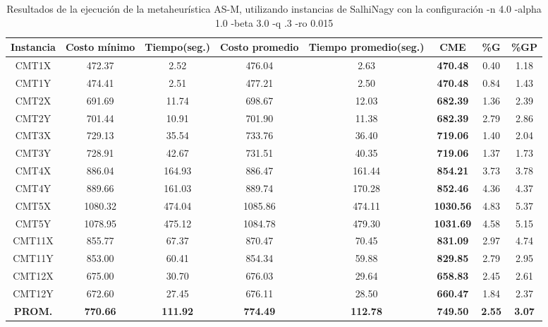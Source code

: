 \begin{table}[h]
\caption{Resultados de la ejecución de la metaheurística AS-M, utilizando instancias de SalhiNagy con la configuración -n 4.0 -alpha 1.0 -beta 3.0 -q .3 -ro 0.015}
\centering
\small
\begin{tabular}{c c c c c c c c}
\hline\hline
Instancia & Costo mínimo & Tiempo(seg.) & Costo promedio & Tiempo promedio(seg.) & CME & \%G & \%GP \\ [0.5ex]
\hline
CMT1X & 472.37 & 2.52 & 
476.04 & 2.63 & \bf{470.48} & 
0.40 & 1.18\\CMT1Y & 474.41 & 2.51 & 
477.21 & 2.50 & \bf{470.48} & 
0.84 & 1.43\\CMT2X & 691.69 & 11.74 & 
698.67 & 12.03 & \bf{682.39} & 
1.36 & 2.39\\CMT2Y & 701.44 & 10.91 & 
701.90 & 11.38 & \bf{682.39} & 
2.79 & 2.86\\CMT3X & 729.13 & 35.54 & 
733.76 & 36.40 & \bf{719.06} & 
1.40 & 2.04\\CMT3Y & 728.91 & 42.67 & 
731.51 & 40.35 & \bf{719.06} & 
1.37 & 1.73\\CMT4X & 886.04 & 164.93 & 
886.47 & 161.44 & \bf{854.21} & 
3.73 & 3.78\\CMT4Y & 889.66 & 161.03 & 
889.74 & 170.28 & \bf{852.46} & 
4.36 & 4.37\\CMT5X & 1080.32 & 474.04 & 
1085.86 & 474.11 & \bf{1030.56} & 
4.83 & 5.37\\CMT5Y & 1078.95 & 475.12 & 
1084.78 & 479.30 & \bf{1031.69} & 
4.58 & 5.15\\CMT11X & 855.77 & 67.37 & 
870.47 & 70.45 & \bf{831.09} & 
2.97 & 4.74\\CMT11Y & 853.00 & 60.41 & 
854.34 & 59.88 & \bf{829.85} & 
2.79 & 2.95\\CMT12X & 675.00 & 30.70 & 
676.03 & 29.64 & \bf{658.83} & 
2.45 & 2.61\\CMT12Y & 672.60 & 27.45 & 
676.11 & 28.50 & \bf{660.47} & 
1.84 & 2.37\\\bf{PROM.} & 
\bf{770.66} & \bf{111.92} & \bf{774.49} & \bf{112.78} & \bf{749.50} & \bf{2.55} & \bf{3.07}\\[1ex]\hline
\end{tabular}
\label{table:nonlin}
\end{table}
